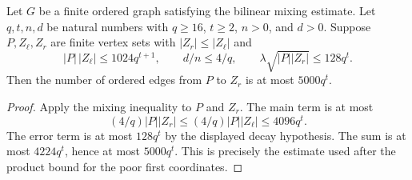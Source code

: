 \begin{helper}
Let $G$ be a finite ordered graph satisfying the bilinear mixing estimate.
Let $q,t,n,d$ be natural numbers with $q\geq16$, $t\geq2$, $n>0$, and
$d>0$.
Suppose $P,Z_\ell,Z_r$ are finite vertex sets with
$|Z_r|\leq|Z_\ell|$ and
\[
 |P|\,|Z_\ell|\leq1024q^{t+1},\qquad d/n\leq4/q,
 \qquad \lambda\sqrt{|P||Z_r|}\leq128q^t.
\]
Then the number of ordered edges from $P$ to $Z_r$ is at most
$5000q^t$.
\end{helper}
\begin{proof}
Apply the mixing inequality to $P$ and $Z_r$.  The main term is at most
\[
 (4/q)|P||Z_r|\leq(4/q)|P||Z_\ell|
 \leq4096q^t.
\]
 The error term is at most $128q^t$ by the displayed decay hypothesis.
The sum is at most $4224q^t$, hence at most $5000q^t$.  This is precisely
the estimate used after the product bound for the poor first coordinates.
\end{proof}

